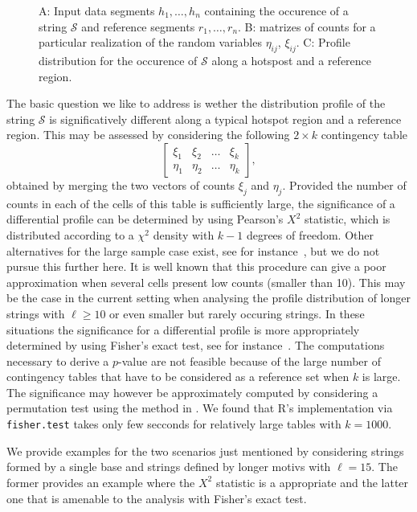 \documentclass{bioinfo}
\begin{document}
\begin{figure}
 
 \caption{A: Input data segments $h_1, \ldots, h_n$ containing the
   occurence of a string $\mathcal S$ and reference segments $r_1,
   \ldots, r_n$. B: matrizes of counts for a
   particular realization of the random variables $\eta_{ij}$,
   $\xi_{ij}$. C: Profile distribution for the occurence of $\mathcal
   S$ along a hotspost and a reference region.} 
 \label{fig:methodscheme}
\end{figure}


The basic question we like to address is wether the distribution
profile of the string $\mathcal S$ is significatively different along
a typical hotspot region and a reference region. This may be assessed
by considering the following $2\times k$ contingency table 
\[
  \begin{bmatrix}
  \xi_1 & \xi_2 & \ldots & \xi_k\\
  \eta_1 & \eta_2 & \ldots & \eta_k
  \end{bmatrix},
\]
obtained by merging the two vectors of counts $\xi_j$ and
$\eta_j$. Provided the number of counts in each of the cells of this
table is sufficiently large, the significance of a differential
profile can be determined by using Pearson's $X^2$ statistic, which is
distributed according to a $\chi^2$ density with $k-1$ degrees of
freedom. Other alternatives for the large sample case exist, see for
instance~\cite{RC}, but we do not pursue this further here.  It is
well known that this procedure can give a poor approximation when
several cells present low counts (smaller than 10). This may be the
case in the current setting when analysing the profile distribution of
longer strings with $\ell \geq 10$ or even smaller but rarely occuring
strings. In these situations the significance for a differential
profile is more appropriately determined by using Fisher's exact test,
see for instance~\cite{A}. The computations necessary to derive a
$p$-value are not feasible because of the large number of contingency
tables that have to be considered as a reference set when $k$ is
large. The significance may however be approximately computed by
considering a permutation test using the method in \cite{P}. We found
that R's implementation via \texttt{fisher.test} takes only few
secconds for relatively large tables with $k=1000$. 

We provide examples for the two scenarios just mentioned by
considering strings formed by a single base and strings defined by
longer motivs with $\ell = 15$. The former provides an example where
the $X^2$ statistic is a appropriate and the latter one that is
amenable to the analysis with Fisher's exact test. 
\end{document}
